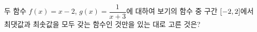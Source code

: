두 함수 $f(x)=x-2$, $g(x)=\dfrac{1}{x+3}$에 대하여 보기의 함수 중 구간 $[-2{,}\mkern3mu\mathopen{}2]$에서 최댓값과 최솟값을 모두 갖는 함수인 것만을 있는 대로 고른 것은? 
